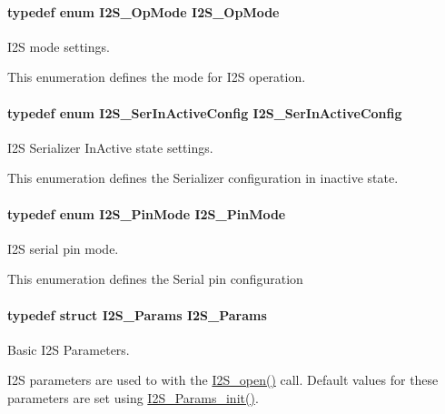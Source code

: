 \paragraph[{I2\+S\+\_\+\+Op\+Mode}]{\setlength{\rightskip}{0pt plus 5cm}typedef enum {\bf I2\+S\+\_\+\+Op\+Mode}  {\bf I2\+S\+\_\+\+Op\+Mode}}\label{_i2_s_8h_a932b2a114f3c9cfd64af554ff3b4496a}


I2\+S mode settings. 

This enumeration defines the mode for I2\+S operation. 
\paragraph[{I2\+S\+\_\+\+Ser\+In\+Active\+Config}]{\setlength{\rightskip}{0pt plus 5cm}typedef enum {\bf I2\+S\+\_\+\+Ser\+In\+Active\+Config}  {\bf I2\+S\+\_\+\+Ser\+In\+Active\+Config}}\label{_i2_s_8h_a19123e5e2c577320f90558cfc640e918}


I2\+S Serializer In\+Active state settings. 

This enumeration defines the Serializer configuration in inactive state. 
\paragraph[{I2\+S\+\_\+\+Pin\+Mode}]{\setlength{\rightskip}{0pt plus 5cm}typedef enum {\bf I2\+S\+\_\+\+Pin\+Mode}  {\bf I2\+S\+\_\+\+Pin\+Mode}}\label{_i2_s_8h_ac3246d834f54bb71d4b58fe945cb9228}


I2\+S serial pin mode. 

This enumeration defines the Serial pin configuration 
\paragraph[{I2\+S\+\_\+\+Params}]{\setlength{\rightskip}{0pt plus 5cm}typedef struct {\bf I2\+S\+\_\+\+Params}  {\bf I2\+S\+\_\+\+Params}}\label{_i2_s_8h_afff1198c952846b6248c11a68f5927ff}


Basic I2\+S Parameters. 

I2\+S parameters are used to with the \hyperlink{_i2_s_8h_aad4ce7cbdf38dc5597f5a92ad056ebc1}{I2\+S\+\_\+open()} call. Default values for these parameters are set using \hyperlink{_i2_s_8h_a961c116273a6e8d4581278b2666f13b5}{I2\+S\+\_\+\+Params\+\_\+init()}.

